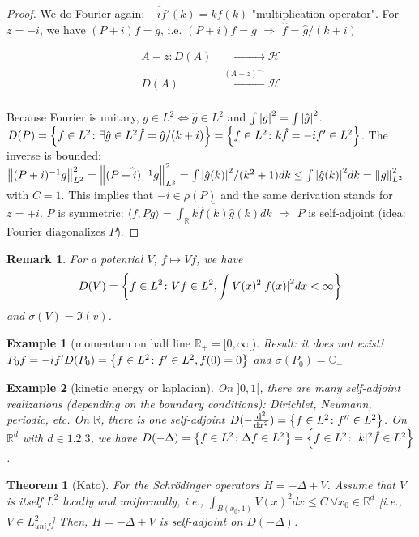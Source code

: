 \documentclass{article}
\newtheorem*{theorem}{Theorem}
\newtheorem*{example}{Example}
\newtheorem*{remark}{Remark}
\newcommand{\RR}{\mathbb{R}}
\newcommand{\CC}{\mathbb{C}}
\newcommand{\cH}{\mathcal{H}}
\newcommand{\sig}{\sigma}
\renewcommand{\sp}[2]{\langle #1,#2 \rangle}
\begin{document}
\begin{proof} 
  We do Fourier again: $\overline{-i f'}(k) = k \hat{f}(k)$ "multiplication operator".
  For $z = -i$, we have $(P + i)f = g$, i.e. $(P + i)f = g$ $\Rightarrow$ $\hat{f} = \hat{g}/(k+i)$
  \begin{align*}
  	A - z \colon D(A) & \xrightarrow{\phantom{(A-z)^{-1}}} \cH \\
                 D(A) & \xleftarrow{(A-z)^{-1}} \cH \\
  \end{align*}

  Because Fourier is unitary, $g \in L^2 \Leftrightarrow \hat{g} \in L^2$
  and $\int \abs{g}^2 = \int \abs{\hat{g}}^2$.
  $D(P) = \qty{ f \in L^2 \colon \exists \hat{g} \in L^2 \hat{f} = \hat{g}/(k+i) } = \qty{ f \in L^2 \colon k \hat{f} = - i f' \in L^2 }$.
  The inverse is bounded: 
  $ \norm{(P + i)^{-1} g}^2_{L^2} = \norm{\hat{(P+i)^{-1}g}}^2_{L^2} 
  = \int \abs{\hat{g}(k)}^2/(k^2+1) dk \le \int \abs{\hat{g}(k)}^2 dk = \norm{g}^2_{L^2}$ with $C = 1$. 
  This implies that $-i \in \rho(P)$ and the same derivation stands for $z=+i$.
  $P$ is symmetric: $\sp{f}{Pg} = \int_\RR k \overline{\hat{f}(k)} \hat{g}(k) dk$
  $\Rightarrow$ $P$ is self-adjoint (idea: Fourier diagonalizes $P$).
\end{proof}

\begin{remark}
  For a potential $V$, $f \mapsto V f$, we have
  $$ D(V) = \qty{ f \in L^2 \colon V f \in L^2, \int V(x)^2 \abs{f(x)}^2 dx < \infty }$$
  and $\sig(V) = \Im(v)$.
\end{remark}

\begin{example}[momentum on half line $\RR_+ = [0,\infty[$]
  Result: it does not exist!
  $P_0 f = - i f'  D(P_0) = \qty{ f \in L^2 \colon f' \in L^2, f(0) = 0 }$
  and $\sig(P_0) = \CC_-$
\end{example}

\begin{example}[kinetic energy or laplacian]
  On $]0,1[$, there are many self-adjoint realizations (depending on the boundary conditions): Dirichlet, Neumann, periodic, etc.
  On $\RR$, there is one self-adjoint $D(-\dv[2]{}{x}) = \qty{ f \in L^2 \colon f'' \in L^2 }$.
  On $\RR^d$ with $d \in \qty{1,2,3}$, we have 
  $D(-\Delta) = \qty{ f \in L^2 \colon \Delta f \in L^2 } = \qty{ f \in L^2 \colon |k|^2 \hat{f} \in L^2 }$.
\end{example}

\begin{theorem}[Kato]
  For the Schr\"odinger operators $H = - \Delta + V$.
  Assume that $V$ is itself $L^2$ locally and uniformally, i.e.,
  $\int_{B(x_0,1)} V(x)^2 dx \le C \ \forall x_0 \in \RR^d$ [i.e., $V \in L^2_{unif}$]
  Then, $H = - \Delta + V$ is self-adjoint on $D(-\Delta)$.
\end{theorem}
\end{document}
